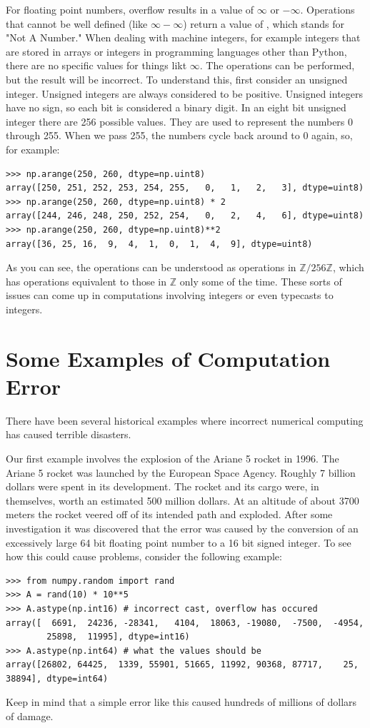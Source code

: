 For floating point numbers, overflow results in a value of $\infty$ or $-\infty$.
Operations that cannot be well defined (like $\infty - \infty$) return a value of , which stands for "Not A Number."
When dealing with machine integers, for example integers that are stored in arrays or integers in programming languages other than Python, there are no specific values for things likt $\infty$.
The operations can be performed, but the result will be incorrect.
To understand this, first consider an unsigned integer.
Unsigned integers are always considered to be positive.
Unsigned integers have no sign, so each bit is considered a binary digit.
In an eight bit unsigned integer there are 256 possible values.
They are used to represent the numbers 0 through 255.
When we pass 255, the numbers cycle back around to 0 again, so, for example:
\begin{lstlisting}
>>> np.arange(250, 260, dtype=np.uint8)
array([250, 251, 252, 253, 254, 255,   0,   1,   2,   3], dtype=uint8)
>>> np.arange(250, 260, dtype=np.uint8) * 2
array([244, 246, 248, 250, 252, 254,   0,   2,   4,   6], dtype=uint8)
>>> np.arange(250, 260, dtype=np.uint8)**2
array([36, 25, 16,  9,  4,  1,  0,  1,  4,  9], dtype=uint8)
\end{lstlisting}
As you can see, the operations can be understood as operations in $\mathbb{Z} / 256 \mathbb{Z}$, which has operations equivalent to those in $\mathbb{Z}$ only some of the time.
These sorts of issues can come up in computations involving integers or even typecasts to integers.

\section*{Some Examples of Computation Error}

There have been several historical examples where incorrect numerical computing has caused terrible disasters.

Our first example involves the explosion of the Ariane 5 rocket in 1996.
The Ariane 5 rocket was launched by the European Space Agency.
Roughly 7 billion dollars were spent in its development.
The rocket and its cargo were, in themselves, worth an estimated 500 million dollars.
At an altitude of about 3700 meters the rocket veered off of its intended path and exploded.
After some investigation it was discovered that the error was caused by the conversion of an excessively large 64 bit floating point number to a 16 bit signed integer.
To see how this could cause problems, consider the following example:
\begin{lstlisting}
>>> from numpy.random import rand
>>> A = rand(10) * 10**5
>>> A.astype(np.int16) # incorrect cast, overflow has occured
array([  6691,  24236, -28341,   4104,  18063, -19080,  -7500,  -4954,
        25898,  11995], dtype=int16)
>>> A.astype(np.int64) # what the values should be
array([26802, 64425,  1339, 55901, 51665, 11992, 90368, 87717,    25, 38894], dtype=int64)
\end{lstlisting}
Keep in mind that a simple error like this caused hundreds of millions of dollars of damage.

